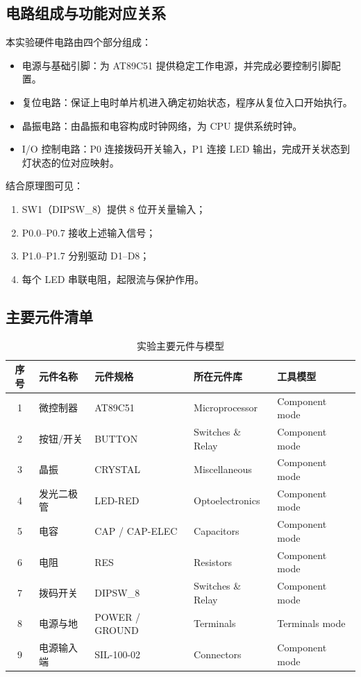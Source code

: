 \subsection{电路组成与功能对应关系}
本实验硬件电路由四个部分组成：
\begin{itemize}
  \item 电源与基础引脚：为 AT89C51 提供稳定工作电源，并完成必要控制引脚配置。
  \item 复位电路：保证上电时单片机进入确定初始状态，程序从复位入口开始执行。
  \item 晶振电路：由晶振和电容构成时钟网络，为 CPU 提供系统时钟。
  \item I/O 控制电路：P0 连接拨码开关输入，P1 连接 LED 输出，完成开关状态到灯状态的位对应映射。
\end{itemize}

结合原理图可见：
\begin{enumerate}
  \item SW1（DIPSW\_8）提供 8 位开关量输入；
  \item P0.0--P0.7 接收上述输入信号；
  \item P1.0--P1.7 分别驱动 D1--D8；
  \item 每个 LED 串联电阻，起限流与保护作用。
\end{enumerate}

\subsection{主要元件清单}
\begin{table}[H]
  \centering
  \caption{实验主要元件与模型}
  \renewcommand{\arraystretch}{1.35}
  \begin{tabular}{cllll}
    \toprule
    序号 & 元件名称 & 元件规格 & 所在元件库 & 工具模型 \\
    \midrule
    1 & 微控制器 & AT89C51 & Microprocessor & Component mode \\
    2 & 按钮/开关 & BUTTON & Switches \& Relay & Component mode \\
    3 & 晶振 & CRYSTAL & Miscellaneous & Component mode \\
    4 & 发光二极管 & LED-RED & Optoelectronics & Component mode \\
    5 & 电容 & CAP / CAP-ELEC & Capacitors & Component mode \\
    6 & 电阻 & RES & Resistors & Component mode \\
    7 & 拨码开关 & DIPSW\_8 & Switches \& Relay & Component mode \\
    8 & 电源与地 & POWER / GROUND & Terminals & Terminals mode \\
    9 & 电源输入端 & SIL-100-02 & Connectors & Component mode \\
    \bottomrule
  \end{tabular}
\end{table}

